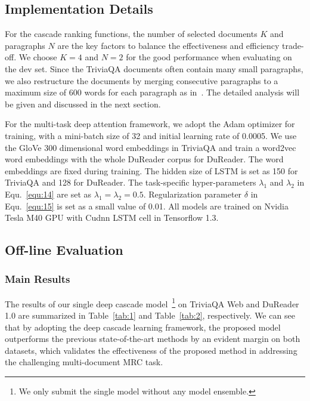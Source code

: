 \documentclass[letterpaper]{article} \usepackage{aaai19}  \usepackage{graphicx}
\begin{document}
\subsection{Implementation Details}
For the cascade ranking functions, the number of selected documents $K$ and paragraphs $N$ are the key factors to balance the effectiveness and efficiency trade-off. We choose $K=4$ and $N=2$ for the good performance when evaluating on the dev set. Since the TriviaQA documents often contain many small paragraphs, we also restructure the documents by merging consecutive paragraphs to a maximum size of 600 words for each paragraph as in~\cite{clark2017simple}. The detailed analysis will be given and discussed in the next section.

For the multi-task deep attention framework, we adopt the Adam optimizer for training, with a mini-batch size of 32 and initial learning rate of 0.0005. We use the GloVe 300 dimensional word embeddings in TriviaQA and train a word2vec word embeddings with the whole DuReader corpus for DuReader. The word embeddings are fixed during training. The hidden size of LSTM is set as 150 for TriviaQA and 128 for DuReader. The task-specific hyper-parameters $\lambda_1$ and $\lambda_2$ in Equ.~\ref{equ:14} are set as $\lambda_1=\lambda_2=0.5$. Regularization parameter $\delta$ in Equ.~\ref{equ:15} is set as a small value of 0.01. All models are trained on Nvidia Tesla M40 GPU with Cudnn LSTM cell in Tensorflow 1.3. 




\subsection{Off-line Evaluation}

\subsubsection{Main Results}
The results of our single deep cascade model~\footnote{\small{We only submit the single model without any model ensemble.}} on TriviaQA Web and DuReader 1.0 are summarized in Table~\ref{tab:1} and Table~\ref{tab:2}, respectively. We can see that by adopting the deep cascade learning framework, the proposed model outperforms the previous state-of-the-art methods by an evident margin on both datasets, which validates the effectiveness of the proposed method in addressing the challenging multi-document MRC task.
\end{document}
